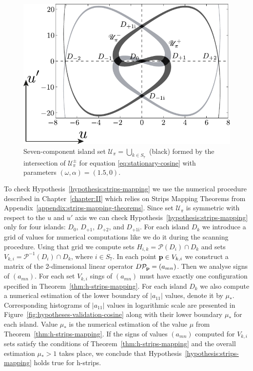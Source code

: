 \begin{figure}[h]
\centering
	\includegraphics[scale = 1]{pic/island set to check hypotheses for cosine equation}
	\caption{
		Seven-component island set $\mathscr{U}_{\pi} = \bigcup_{k \in S_7}$ (black) formed by the intersection of $\mathscr{U}_{\pi}^{\pm}$ for equation \eqref{eq:stationary-cosine} with parameters $(\omega, \alpha) = (1.5, 0)$.
	}
\label{fig:island-set-cosine}
\end{figure}

To check Hypothesis~\ref{hypothesis:strips-mapping} we use the numerical procedure described in Chapter~\ref{chapter:II} which relies on Strips Mapping Theorems from Appendix~\ref{appendix:strips-mapping-theorems}.
Since set $\mathscr{U}_{\pi}$ is symmetric with respect to the $u$ and $u'$ axis we can check Hypothesis~\ref{hypothesis:strips-mapping} only for four islands: $D_0$, $D_{+1}$, $D_{+2}$, and $D_{+1\mathrm{i}}$.
For each island $D_k$ we introduce a grid of values for numerical computations like we do it during the scanning procedure.
Using that grid we compute sets $H_{i, k} = \mathcal{P}(D_i) \cap D_k$ and sets $V_{k, i} = \mathcal{P}^{-1}(D_i) \cap D_k$, where $i \in S_7$.
In each point $\vb{p} \in V_{k, i}$ we construct a matrix of the 2-dimensional linear operator $D \mathcal{P}_{\vb{p}} = (a_{mn})$.
Then we analyse signs of $(a_{mn})$.
For each set $V_{k, i}$ sings of $(a_{mn})$ must have exactly one configuration specified in Theorem~\ref{thm:h-strips-mapping}.
For each island $D_k$ we also compute a numerical estimation of the lower boundary of $|a_{11}|$ values, denote it by $\mu_*$.
Corresponding histograms of $|a_{11}|$ values in logarithmic scale are presented in Figure~\ref{fig:hypotheses-validation-cosine} along with their lower boundary $\mu_*$ for each island.
Value $\mu_*$ is the numerical estimation of the value $\mu$ from Theorem~\ref{thm:h-strips-mapping}.
If the signs of values $(a_{mn})$ computed for $V_{k, i}$ sets satisfy the conditions of Theorem~\ref{thm:h-strips-mapping} and the overall estimation $\mu_* > 1$ takes place, we conclude that Hypothesis~\ref{hypothesis:strips-mapping} holds true for h-strips.


